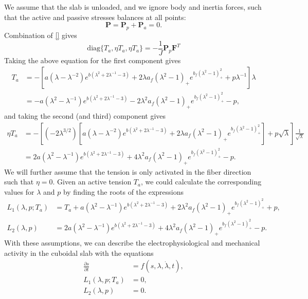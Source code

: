 We assume that the slab is unloaded, and we ignore body and inertia
forces, such that the active and passive stresses balances at all
points: \[
\begin{equation}
\mathbf{P}=\mathbf{P}_{p}+\mathbf{P}_{a}=0.
\end{equation}
\] Combination of \eqref{} gives \[
\begin{equation}
\text{diag}\{T_{a},\eta T_{a},\eta T_{a}\}=-\frac{1}{J}\mathbf{P}_{p}\mathbf{F}^T
\end{equation}
\] Taking the above equation for the first component gives \[
\begin{align}
T_{a} & =-\left[ a(\lambda-\lambda^{-2})e^{ b(\lambda^2+2\lambda^{-1}-3) }+2\lambda a_{f}(\lambda^2-1)_{+}e^{ b_{f}(\lambda^2-1)_{+}^2 }+p\lambda^{-1} \right] \lambda \\
 & =-a(\lambda^2-\lambda^{-1})e^{ b(\lambda^2+2\lambda^{-1}-3) }-2\lambda^2 a_{f}(\lambda^2-1)_{+}e^{ b_{f}(\lambda^2-1)_{+}^2 }-p,
\end{align}
\] and taking the second (and third) component gives \[
\begin{align}
\eta T_{a} & = - \left[ (-2\lambda^{3/2})\left[ a(\lambda-\lambda^{-2})e^{ b(\lambda^2+2\lambda^{-1}-3) }+2\lambda a_{f}(\lambda^2-1)_{+}e^{ b_{f}(\lambda^2-1)_{+}^2 } \right] +p\sqrt{ \lambda } \right] \frac{1}{\sqrt{ \lambda }} \\
 & =2a(\lambda^2-\lambda^{-1})e^{ b(\lambda^2+2\lambda^{-1}-3) }+4\lambda^2 a_{f}(\lambda^2-1)_{+}e^{ b_{f}(\lambda^2-1)_{+}^2 }-p.
\end{align}
\] We will further assume that the tension is only activated in the
fiber direction such that \(\eta=0\). Given an active tension \(T_{a}\),
we could calculate the corresponding values for \(\lambda\) and \(p\) by
finding the roots of the expressions \[
\begin{align}
L_{1}(\lambda,p;T_{a}) & =T_{a}+a(\lambda^2-\lambda^{-1})e^{ b(\lambda^2+2\lambda^{-1}-3) }+2\lambda^2 a_{f}(\lambda^2-1)_{+}e^{ b_{f}(\lambda^2-1)_{+}^2 }+p, \\
L_{2}(\lambda,p) & =2a(\lambda^2-\lambda^{-1})e^{ b(\lambda^2+2\lambda^{-1}-3) }+4\lambda^2 a_{f}(\lambda^2-1)_{+}e^{ b_{f}(\lambda^2-1)_{+}^2 }-p.
\end{align}
\] With these assumptions, we can describe the electrophysiological and
mechanical activity in the cuboidal slab with the equations \[
\begin{align}
\frac{ \partial s }{ \partial t }  & =f(s,\lambda,\dot{\lambda},t), \\
L_{1}(\lambda,p;T_{a}) & =0, \\
L_{2}(\lambda,p)  & =0.
\end{align}
\]


